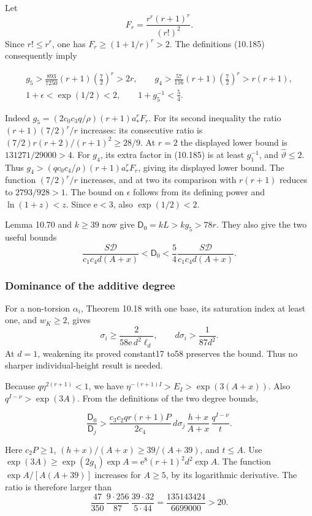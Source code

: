 \documentclass[
  11pt,
  a4paper,
]{article}
\begin{document}
Let \[
F_r=\frac{r^r(r+1)^r}{(r!)^2}.
\] Since \(r!\le r^r\), one has \(F_r\ge(1+1/r)^r>2\). The definitions
(10.185) consequently imply

\[
\begin{gathered}
g_5>
\frac{893}{7250}(r+1)\left(\frac72\right)^r>2r,\qquad
g_4>\frac{57}{116}(r+1)\left(\frac72\right)^r>r(r+1),\\
1+\epsilon<\exp(1/2)<2,\qquad
1+g_5^{-1}<\frac54.
\end{gathered}
\tag{10.269}
\]

Indeed \(g_5=(2c_0c_3q/\rho)(r+1)a_*^rF_r\). For its second inequality
the ratio \((r+1)(7/2)^r/r\) increases: its consecutive ratio is
\((7/2)r(r+2)/(r+1)^2\ge28/9\). At \(r=2\) the displayed lower bound is
\(131271/29000>4\). For \(g_4\), its extra factor in (10.185) is at
least \(g_1^{-1}\), and \(\widehat\vartheta\le2\). Thus
\(g_4>(qc_0c_4/\rho)(r+1)a_*^rF_r\), giving its displayed lower bound.
The function \((7/2)^r/r\) increases, and at two its comparison with
\(r(r+1)\) reduces to \(2793/928>1\). The bound on \(\epsilon\) follows
from its defining power and \(\ln(1+z)<z\). Since \(\mathrm e<3\), also
\(\exp(1/2)<2\).

Lemma 10.70 and \(k\ge39\) now give \(\mathsf D_0=kL>kg_5>78r\). They
also give the two useful bounds \[
\frac{S\mathcal D}{c_1c_4d(A+x)}
<\mathsf D_0
<\frac54\frac{S\mathcal D}{c_1c_4d(A+x)}.
\]

\subsubsection{Dominance of the additive
degree}\label{dominance-of-the-additive-degree}

For a non-torsion \(\alpha_i\), Theorem 10.18 with one base, its
saturation index at least one, and \(w_K\ge2\), gives \[
\sigma_i\ge\frac{2}{58\mathrm e\,d^2\ell_d},
\qquad d\sigma_i>\frac1{87d^2}.
\] At \(d=1\), weakening its proved constant17 to58 preserves the bound.
Thus no sharper individual-height result is needed.

Because \(q\eta^{2(r+1)}<1\), we have
\(\eta^{-(r+1)I}>E_I>\exp(3(A+x))\). Also \(q^{I-\nu}> \exp(3A)\). From
the definitions of the two degree bounds,

\[
\frac{\mathsf D_0}{\mathsf D_j}
>\frac{c_3c_2qr(r+1)P}{2c_4}\,
d\sigma_j\,\frac{h+x}{A+x}\,\frac{q^{I-\nu}}t.
\]

Here \(c_2P\ge1\), \((h+x)/(A+x)\ge39/(A+39)\), and \(t\le A\). Use
\(\exp(3A)\ge\exp(2g_1)\exp A
=\mathrm e^8(r+1)^2d^2\exp A\). The function \(\exp A/[A(A+39)]\)
increases for \(A\ge5\), by its logarithmic derivative. The ratio is
therefore larger than \[
\frac{47}{350}\,\frac{9\cdot256}{87}\,
\frac{39\cdot32}{5\cdot44}
=\frac{135143424}{6699000}>20.
\]
\end{document}
